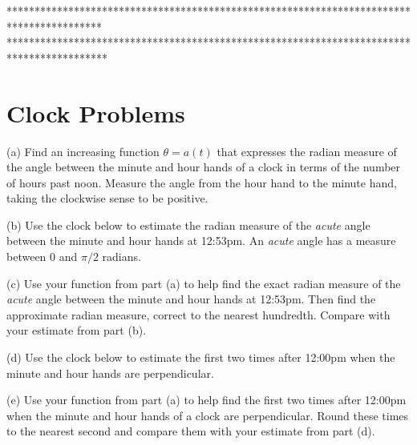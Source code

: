 \documentclass{ximera}
\begin{document}
\iffalse

*****************************************************************************************
******************************************************************************************

\section{Clock Problems}


\begin{question}   \label{Q54: Angles}
(a) Find an increasing function $\theta = a(t)$ that expresses the radian measure of the angle between the minute and hour hands of a clock in terms of the number of hours past noon. Measure the angle from the hour hand to the minute hand, taking the clockwise sense to be positive. %

(b) Use the clock below to estimate the radian measure of the \emph{acute} angle between the minute and hour hands at 12:53pm. An \emph{acute} angle has a measure between $0$ and $\pi/2$ radians.

(c) Use your function from part (a) to help find the exact radian measure of the \emph{acute} angle between the minute and hour hands at 12:53pm. Then find the approximate radian measure, correct to the nearest hundredth. Compare with your estimate from part (b).

(d) Use the clock below to estimate the first two times after 12:00pm when the minute and hour hands are perpendicular.

(e) Use your function from part (a) to help find the first two times after 12:00pm when the minute and hour hands of a clock are perpendicular. Round these times to the nearest second and compare them with your estimate from part (d).

 
\begin{onlineOnly}
    \begin{center}
\end{center}
\end{onlineOnly}

\end{question}
\end{document}

